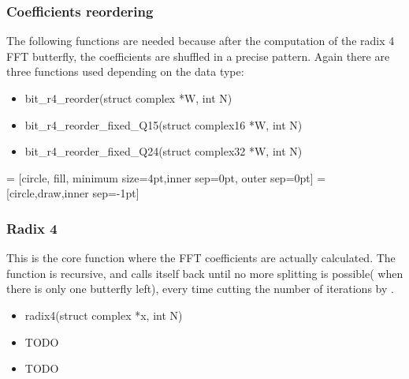 \documentclass[a4paper]{article}
\begin{document}
\subsubsection{Coefficients reordering}
The following functions are needed because after the computation of the radix 4 FFT butterfly, the coefficients are shuffled in a precise pattern.
Again there are three functions used depending on the data type:
\begin{itemize}
	\item bit\_r4\_reorder(struct complex *W, int N)
	\item bit\_r4\_reorder\_fixed\_Q15(struct complex16 *W, int N)
	\item bit\_r4\_reorder\_fixed\_Q24(struct complex32 *W, int N)
\end{itemize}






= [circle, fill, minimum size=4pt,inner sep=0pt, outer sep=0pt]
 = [circle,draw,inner sep=-1pt]













\subsubsection{Radix 4 }
This is the core function where the FFT coefficients are actually calculated. The function is recursive, and calls itself back until no more splitting is possible( when there is only one butterfly left), every time cutting the number of iterations by .
\begin{itemize}
	\item radix4(struct complex *x, int N)
	\item TODO
	\item TODO
\end{itemize}
\end{document}
